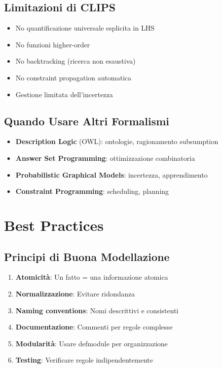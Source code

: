 \subsection{Limitazioni di CLIPS}

\begin{itemize}
\item No quantificazione universale esplicita in LHS
\item No funzioni higher-order
\item No backtracking (ricerca non esaustiva)
\item No constraint propagation automatica
\item Gestione limitata dell'incertezza
\end{itemize}

\subsection{Quando Usare Altri Formalismi}

\begin{itemize}
\item \textbf{Description Logic} (OWL): ontologie, ragionamento subsumption
\item \textbf{Answer Set Programming}: ottimizzazione combinatoria
\item \textbf{Probabilistic Graphical Models}: incertezza, apprendimento
\item \textbf{Constraint Programming}: scheduling, planning
\end{itemize}

\section{Best Practices}

\subsection{Principi di Buona Modellazione}

\begin{infobox}
\begin{enumerate}
\item \textbf{Atomicità}: Un fatto = una informazione atomica
\item \textbf{Normalizzazione}: Evitare ridondanza
\item \textbf{Naming conventions}: Nomi descrittivi e consistenti
\item \textbf{Documentazione}: Commenti per regole complesse
\item \textbf{Modularità}: Usare defmodule per organizzazione
\item \textbf{Testing}: Verificare regole indipendentemente
\end{enumerate}
\end{infobox}

